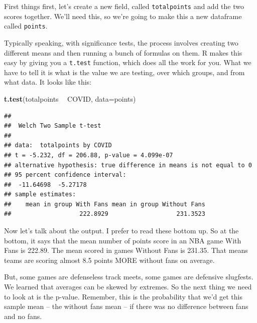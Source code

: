 \documentclass[
]{book}
\newenvironment{Shaded}{\begin{snugshade}}{\end{snugshade}}
\newcommand{\DataTypeTok}[1]{\textcolor[rgb]{0.13,0.29,0.53}{#1}}
\newcommand{\KeywordTok}[1]{\textcolor[rgb]{0.13,0.29,0.53}{\textbf{#1}}}
\newcommand{\NormalTok}[1]{#1}
\newcommand{\OperatorTok}[1]{\textcolor[rgb]{0.81,0.36,0.00}{\textbf{#1}}}
\newcommand{\StringTok}[1]{\textcolor[rgb]{0.31,0.60,0.02}{#1}}
\begin{document}
First things first, let's create a new field, called \texttt{totalpoints} and add the two scores together. We'll need this, so we're going to make this a new dataframe called \texttt{points}.

\begin{Shaded}
\end{Shaded}

Typically speaking, with significance tests, the process involves creating two different means and then running a bunch of formulas on them. R makes this easy by giving you a \texttt{t.test} function, which does all the work for you. What we have to tell it is what is the value we are testing, over which groups, and from what data. It looks like this:

\begin{Shaded}
\begin{Highlighting}[]
\KeywordTok{t.test}\NormalTok{(totalpoints }\OperatorTok{~}\StringTok{ }\NormalTok{COVID, }\DataTypeTok{data=}\NormalTok{points)}
\end{Highlighting}
\end{Shaded}

\begin{verbatim}
## 
## 	Welch Two Sample t-test
## 
## data:  totalpoints by COVID
## t = -5.232, df = 206.88, p-value = 4.099e-07
## alternative hypothesis: true difference in means is not equal to 0
## 95 percent confidence interval:
##  -11.64698  -5.27178
## sample estimates:
##    mean in group With Fans mean in group Without Fans 
##                   222.8929                   231.3523
\end{verbatim}

Now let's talk about the output. I prefer to read these bottom up. So at the bottom, it says that the mean number of points score in an NBA game With Fans is 222.89. The mean scored in games Without Fans is 231.35. That means teams are scoring almost 8.5 points MORE without fans on average.

But, some games are defenseless track meets, some games are defensive slugfests. We learned that averages can be skewed by extremes. So the next thing we need to look at is the p-value. Remember, this is the probability that we'd get this sample mean -- the without fans mean -- if there was no difference between fans and no fans.
\end{document}
